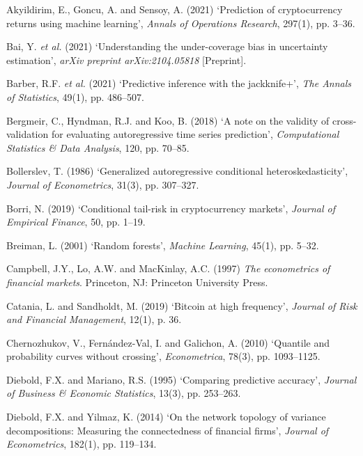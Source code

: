 \documentclass[
  a4paper,
  DIV=11,
  numbers=noendperiod]{scrreprt}
\newlength{\cslhangindent}
\newenvironment{CSLReferences}[2] %
 {\begin{list}{}{%
  \setlength{\itemindent}{0pt}
  \setlength{\leftmargin}{0pt}
  \setlength{\parsep}{0pt}
  \ifodd #1
   \setlength{\leftmargin}{\cslhangindent}
   \setlength{\itemindent}{-1\cslhangindent}
  \fi
  \setlength{\itemsep}{#2\baselineskip}}}
 {\end{list}}
\begin{document}
\label{refs}
\begin{CSLReferences}{0}{1}
Akyildirim, E., Goncu, A. and Sensoy, A. (2021) {`Prediction of
cryptocurrency returns using machine learning'}, \emph{Annals of
Operations Research}, 297(1), pp. 3--36.

Bai, Y. \emph{et al.} (2021) {`Understanding the under-coverage bias in
uncertainty estimation'}, \emph{arXiv preprint arXiv:2104.05818}
{[}Preprint{]}.

Barber, R.F. \emph{et al.} (2021) {`Predictive inference with the
jackknife+'}, \emph{The Annals of Statistics}, 49(1), pp. 486--507.

Bergmeir, C., Hyndman, R.J. and Koo, B. (2018) {`A note on the validity
of cross-validation for evaluating autoregressive time series
prediction'}, \emph{Computational Statistics \& Data Analysis}, 120, pp.
70--85.

Bollerslev, T. (1986) {`Generalized autoregressive conditional
heteroskedasticity'}, \emph{Journal of Econometrics}, 31(3), pp.
307--327.

Borri, N. (2019) {`Conditional tail-risk in cryptocurrency markets'},
\emph{Journal of Empirical Finance}, 50, pp. 1--19.

Breiman, L. (2001) {`Random forests'}, \emph{Machine Learning}, 45(1),
pp. 5--32.

Campbell, J.Y., Lo, A.W. and MacKinlay, A.C. (1997) \emph{The
econometrics of financial markets}. Princeton, NJ: Princeton University
Press.

Catania, L. and Sandholdt, M. (2019) {`Bitcoin at high frequency'},
\emph{Journal of Risk and Financial Management}, 12(1), p. 36.

Chernozhukov, V., Fernández-Val, I. and Galichon, A. (2010) {`Quantile
and probability curves without crossing'}, \emph{Econometrica}, 78(3),
pp. 1093--1125.

Diebold, F.X. and Mariano, R.S. (1995) {`Comparing predictive
accuracy'}, \emph{Journal of Business \& Economic Statistics}, 13(3),
pp. 253--263.

Diebold, F.X. and Yilmaz, K. (2014) {`On the network topology of
variance decompositions: Measuring the connectedness of financial
firms'}, \emph{Journal of Econometrics}, 182(1), pp. 119--134.


\end{CSLReferences}
\end{document}

